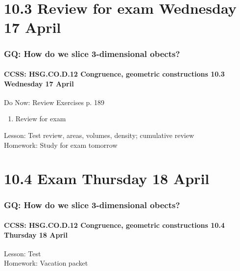 \documentclass{beamer}
\begin{document}
\section{10.3 Review for exam Wednesday 17 April}
  \frame
  {
    \frametitle{GQ: How do we slice 3-dimensional obects?}
    \framesubtitle{CCSS: HSG.CO.D.12 Congruence, geometric constructions \hfill \alert{10.3 Wednesday 17 April}}

    \begin{block}{Do Now: Review Exercises p. 189}
      \begin{enumerate}
        \item Review for exam
    \end{enumerate}
    \end{block}
    Lesson: Test review, areas, volumes, density; cumulative review\\[1cm]
    Homework: Study for \alert{exam tomorrow}
  }

\section{10.4 Exam Thursday 18 April}
  \frame
  {
    \frametitle{GQ: How do we slice 3-dimensional obects?}
    \framesubtitle{CCSS: HSG.CO.D.12 Congruence, geometric constructions \hfill \alert{10.4 Thursday 18 April}}

    Lesson: Test \\[1cm]
    Homework: Vacation packet
  }
\end{document}
